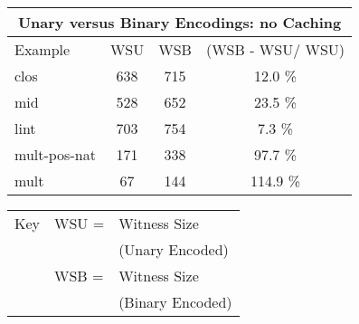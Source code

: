 \documentclass{llncs}
\begin{document}
\begin{tabbing}
\begin{small}
\begin{minipage}{3in}
\begin{tabular}{|l|c|c|c|}
\multicolumn{4}{c}{Unary versus Binary Encodings: no Caching}\\
\hline
Example & WSU & WSB & (WSB - WSU/ WSU) \\
\hline
clos & 638 & 715 & 12.0 \%\\
mid & 528 & 652 & 23.5 \%\\
lint & 703 & 754 & 7.3 \%\\
mult-pos-nat & 171 & 338 & 97.7 \%\\
mult & 67 & 144 & 114.9 \%\\
\hline
\end{tabular}
\end{minipage}
\begin{minipage}{2in}
\begin{tabular}{lll}
Key & WSU = & Witness Size \\ &&(Unary Encoded)\\
&WSB = & Witness Size \\&&(Binary Encoded)\\
\end{tabular} 
\end{minipage}
\end{small}
\end{tabbing}
\end{document}
